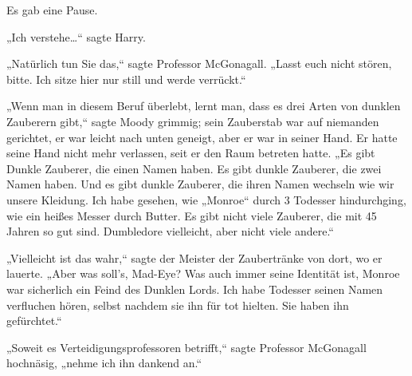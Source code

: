 Es gab eine Pause.

„Ich verstehe…“ sagte Harry.

„Natürlich tun Sie das,“ sagte Professor McGonagall. „Lasst euch nicht stören, bitte. Ich sitze hier nur still und werde verrückt.“

„Wenn man in diesem Beruf überlebt, lernt man, dass es drei Arten von dunklen Zauberern gibt,“ sagte Moody grimmig; sein Zauberstab war auf niemanden gerichtet, er war leicht nach unten geneigt, aber er war in seiner Hand. Er hatte seine Hand nicht mehr verlassen, seit er den Raum betreten hatte. „Es gibt Dunkle Zauberer, die einen Namen haben. Es gibt dunkle Zauberer, die zwei Namen haben. Und es gibt dunkle Zauberer, die ihren Namen wechseln wie wir unsere Kleidung. Ich habe gesehen, wie „Monroe“ durch 3 Todesser hindurchging, wie ein heißes Messer durch Butter. Es gibt nicht viele Zauberer, die mit 45 Jahren so gut sind. Dumbledore vielleicht, aber nicht viele andere.“

„Vielleicht ist das wahr,“ sagte der Meister der Zaubertränke von dort, wo er lauerte. „Aber was soll's, Mad-Eye? Was auch immer seine Identität ist, Monroe war sicherlich ein Feind des Dunklen Lords. Ich habe Todesser seinen Namen verfluchen hören, selbst nachdem sie ihn für tot hielten. Sie haben ihn gefürchtet.“

„Soweit es Verteidigungsprofessoren betrifft,“ sagte Professor McGonagall hochnäsig, „nehme ich ihn dankend an.“

